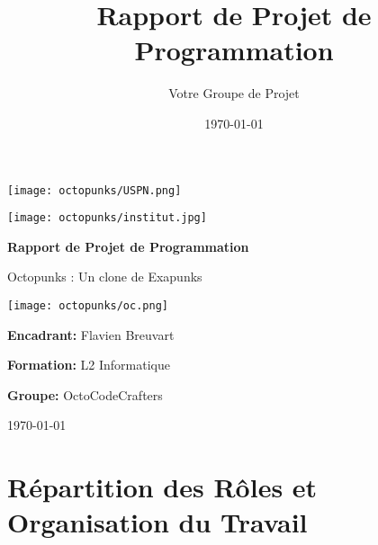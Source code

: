 \documentclass{article}
\title{Rapport de Projet de Programmation}
\author{Votre Groupe de Projet}
\date{\today}
\begin{document}
\begin{titlepage}
    \centering
    \begin{minipage}[t]{0.45\textwidth}
        \raggedright
        \texttt{[image: octopunks/USPN.png]}
    \end{minipage}
    \hfill
    \begin{minipage}[t]{0.45\textwidth}
        \raggedleft
        \texttt{[image: octopunks/institut.jpg]}
    \end{minipage}\par\vspace{1cm}
    
    {\Huge\bfseries Rapport de Projet de Programmation\par}
    \vspace{0.8cm}
    {\LARGE Octopunks : Un clone de Exapunks\par}
    \vspace{1.2cm}
    \texttt{[image: octopunks/oc.png]}\par\vspace{1.2cm}
    
    \begin{minipage}[t]{0.45\textwidth}
        \raggedright
        \textbf{Encadrant:} Flavien Breuvart\par
        \textbf{Formation:} L2 Informatique\par
    \end{minipage}
    \hfill
    \begin{minipage}[t]{0.45\textwidth}
        \raggedleft
        {\Large\textbf{Groupe:} OctoCodeCrafters\par}
    \end{minipage}\par\vspace{1.2cm}
    
    {\Large \today\par}
\end{titlepage}


\section{Répartition des Rôles et Organisation du Travail}
\end{document}
